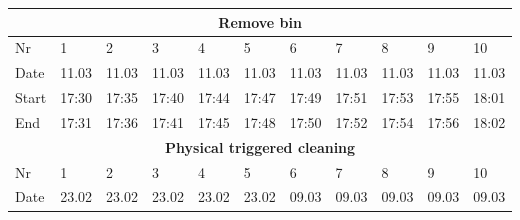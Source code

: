 \begin{table}[H]
\begin{tabular}{|lllllllllll|}
\multicolumn{11}{|c|}{\textbf{Remove bin}}                                                                                                                                                                                                                                                                \\ \hline
\multicolumn{1}{|l|}{Nr} & \multicolumn{1}{l|}{1}     & \multicolumn{1}{l|}{2}     & \multicolumn{1}{l|}{3}     & \multicolumn{1}{l|}{4}     & \multicolumn{1}{l|}{5}     & \multicolumn{1}{l|}{6}     & \multicolumn{1}{l|}{7}     & \multicolumn{1}{l|}{8}     & \multicolumn{1}{l|}{9}     & 10    \\ \hline
\multicolumn{1}{|l|}{Date}   & \multicolumn{1}{l|}{11.03} & \multicolumn{1}{l|}{11.03} & \multicolumn{1}{l|}{11.03} & \multicolumn{1}{l|}{11.03} & \multicolumn{1}{l|}{11.03} & \multicolumn{1}{l|}{11.03} & \multicolumn{1}{l|}{11.03} & \multicolumn{1}{l|}{11.03} & \multicolumn{1}{l|}{11.03} & 11.03 \\ \hline
\multicolumn{1}{|l|}{Start}  & \multicolumn{1}{l|}{17:30} & \multicolumn{1}{l|}{17:35} & \multicolumn{1}{l|}{17:40} & \multicolumn{1}{l|}{17:44} & \multicolumn{1}{l|}{17:47} & \multicolumn{1}{l|}{17:49} & \multicolumn{1}{l|}{17:51} & \multicolumn{1}{l|}{17:53} & \multicolumn{1}{l|}{17:55} & 18:01 \\ \hline
\multicolumn{1}{|l|}{End}    & \multicolumn{1}{l|}{17:31} & \multicolumn{1}{l|}{17:36} & \multicolumn{1}{l|}{17:41} & \multicolumn{1}{l|}{17:45} & \multicolumn{1}{l|}{17:48} & \multicolumn{1}{l|}{17:50} & \multicolumn{1}{l|}{17:52} & \multicolumn{1}{l|}{17:54} & \multicolumn{1}{l|}{17:56} & 18:02 \\ \hline
\multicolumn{11}{|c|}{\textbf{Physical triggered cleaning}}                                                                                                                                                                                                                                               \\ \hline
\multicolumn{1}{|l|}{Nr} & \multicolumn{1}{l|}{1}     & \multicolumn{1}{l|}{2}     & \multicolumn{1}{l|}{3}     & \multicolumn{1}{l|}{4}     & \multicolumn{1}{l|}{5}     & \multicolumn{1}{l|}{6}     & \multicolumn{1}{l|}{7}     & \multicolumn{1}{l|}{8}     & \multicolumn{1}{l|}{9}     & 10    \\ \hline
\multicolumn{1}{|l|}{Date}   & \multicolumn{1}{l|}{23.02} & \multicolumn{1}{l|}{23.02} & \multicolumn{1}{l|}{23.02} & \multicolumn{1}{l|}{23.02} & \multicolumn{1}{l|}{23.02} & \multicolumn{1}{l|}{09.03} & \multicolumn{1}{l|}{09.03} & \multicolumn{1}{l|}{09.03} & \multicolumn{1}{l|}{09.03} & 09.03 \\ \hline

\end{tabular}
\end{table}
